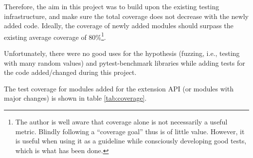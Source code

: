 Therefore, the aim in this project was to build upon the existing testing
infrastructure, and make sure the total coverage does not decrease with the
newly added code. Ideally, the coverage of newly added modules should surpass
the existing average coverage of 80\%\footnote{The author is well aware that
  coverage alone is not necessarily a useful metric. Blindly following a
  ``coverage goal'' thus is of little value. However, it is useful when using it
  as a guideline while consciously developing good tests, which is what has been
  done.}.

Unfortunately, there were no good uses for the hypothesis (fuzzing, i.e.,
testing with many random values) and pytest-benchmark libraries while adding
tests for the code added/changed during this project.

The test coverage for modules added for the extension API (or modules with major
changes) is shown in table \ref{tab:coverage}.

